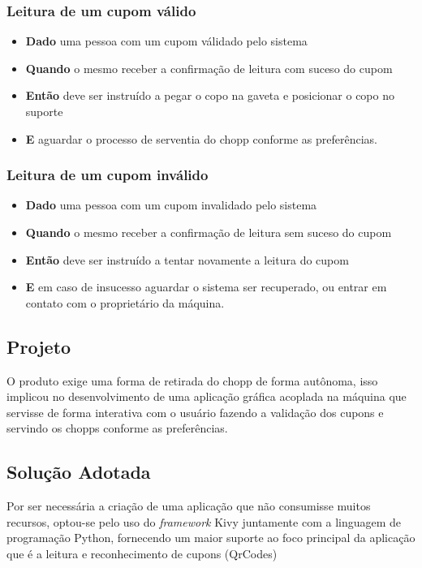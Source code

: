 \subsubsection[Leitura de um cupom válido]{Leitura de um cupom válido}
\begin{itemize}
    \item \textbf{Dado} uma pessoa com um cupom válidado pelo sistema
    \item \textbf{Quando} o mesmo receber a confirmação de leitura com suceso do cupom
    \item \textbf{Então} deve ser instruído a pegar o copo na gaveta e posicionar o copo
    no suporte
    \item \textbf{E} aguardar o processo de serventia do chopp conforme as preferências.
\end{itemize}

\subsubsection[Leitura de um cupom inválido]{Leitura de um cupom inválido}
\begin{itemize}
    \item \textbf{Dado} uma pessoa com um cupom invalidado pelo sistema
    \item \textbf{Quando} o mesmo receber a confirmação de leitura sem suceso do cupom
    \item \textbf{Então} deve ser instruído a tentar novamente a leitura do cupom
    \item \textbf{E} em caso de insucesso aguardar o sistema ser recuperado, ou entrar
    em contato com o proprietário da máquina.
\end{itemize}

\subsection[Projeto]{Projeto}
O produto exige uma forma de retirada do chopp de forma autônoma, isso implicou no desenvolvimento
de uma aplicação gráfica acoplada na máquina que servisse de forma interativa com o usuário fazendo
a validação dos cupons e servindo os chopps conforme as preferências.

\subsection[Solução Adotada]{Solução Adotada}
Por ser necessária a criação de uma aplicação que não consumisse muitos recursos, optou-se pelo
uso do \textit{framework} Kivy juntamente com a linguagem de programação Python, fornecendo
um maior suporte ao foco principal da aplicação que é a leitura e reconhecimento de cupons (QrCodes)

